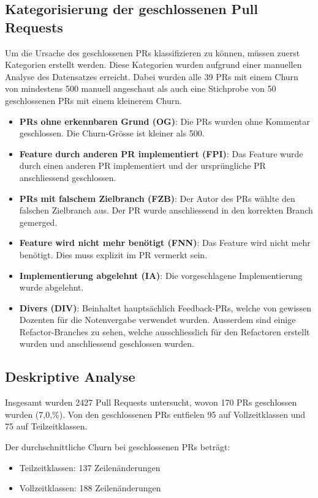 \subsection{Kategorisierung der geschlossenen Pull Requests}
\label{sec:KategorienGeschlossenePRs} 
Um die Ursache des geschlossenen PRs klassifizieren zu können, müssen zuerst Kategorien erstellt werden. Diese Kategorien wurden aufgrund einer manuellen Analyse des Datensatzes erreicht. Dabei wurden alle 39 PRs mit einem Churn von mindestens 500 manuell angeschaut als auch eine Stichprobe von 50 geschlossenen PRs mit einem kleinerem Churn.
\begin{itemize}
    \item \textbf{PRs ohne erkennbaren Grund (OG)}: Die PRs wurden ohne Kommentar geschlossen. Die Churn-Grösse ist kleiner als 500.
    \item \textbf{Feature durch anderen PR implementiert (FPI)}: Das Feature wurde durch einen anderen PR implementiert und der ursprüngliche PR anschliessend geschlossen.
    \item \textbf{PRs mit falschem Zielbranch (FZB)}: Der Autor des PRs wählte den falschen Zielbranch aus. Der PR wurde anschliessend in den korrekten Branch gemerged.
    \item \textbf{Feature wird nicht mehr benötigt (FNN)}: Das Feature wird nicht mehr benötigt. Dies muss explizit im PR vermerkt sein.
    \item \textbf{Implementierung abgelehnt (IA)}: Die vorgeschlagene Implementierung wurde abgelehnt.
    \item \textbf{Divers (DIV)}: Beinhaltet hauptsächlich Feedback-PRs, welche von gewissen Dozenten für die Notenvergabe verwendet wurden. Ausserdem sind einige Refactor-Branches zu sehen, welche ausschliesslich für den Refactoren erstellt wurden und anschliessend geschlossen wurden. 
\end{itemize}

\subsection{Deskriptive Analyse}
Insgesamt wurden 2427 Pull Requests untersucht, wovon 170 PRs geschlossen wurden (7,0,\%). Von den geschlossenen PRs entfielen 95 auf Vollzeitklassen und 75 auf Teilzeitklassen.

Der durchschnittliche Churn bei geschlossenen PRs beträgt: \begin{itemize} \item Teilzeitklassen: 137 Zeilenänderungen \item Vollzeitklassen: 188 Zeilenänderungen \end{itemize}

